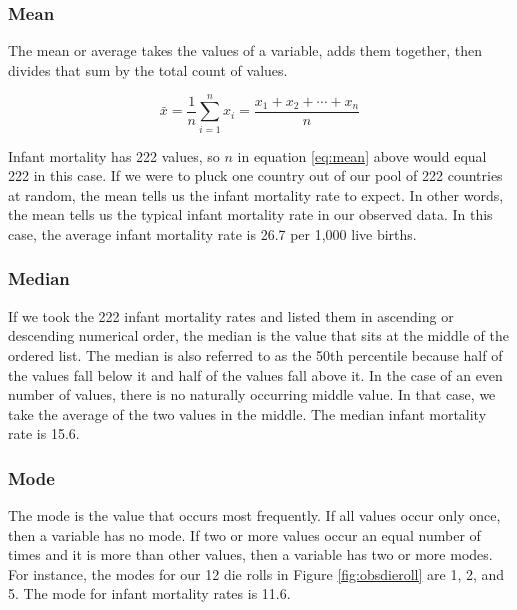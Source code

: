 \documentclass[
]{book}
\begin{document}
\hypertarget{mean}{%
\subsubsection*{Mean}\label{mean}}


The mean or average takes the values of a variable, adds them together, then divides that sum by the total count of values.

\begin{equation}
{\displaystyle \bar{x}={\frac {1}{n}}\sum _{i=1}^{n}x_{i}={\frac {x_{1}+x_{2}+\cdots +x_{n}}{n}}}
\label{eq:mean}
\end{equation}

Infant mortality has 222 values, so \(n\) in equation \eqref{eq:mean} above would equal 222 in this case. If we were to pluck one country out of our pool of 222 countries at random, the mean tells us the infant mortality rate to expect. In other words, the mean tells us the typical infant mortality rate in our observed data. In this case, the average infant mortality rate is 26.7 per 1,000 live births.

\hypertarget{median}{%
\subsubsection*{Median}\label{median}}


If we took the 222 infant mortality rates and listed them in ascending or descending numerical order, the median is the value that sits at the middle of the ordered list. The median is also referred to as the 50th percentile because half of the values fall below it and half of the values fall above it. In the case of an even number of values, there is no naturally occurring middle value. In that case, we take the average of the two values in the middle. The median infant mortality rate is 15.6.

\hypertarget{mode}{%
\subsubsection*{Mode}\label{mode}}


The mode is the value that occurs most frequently. If all values occur only once, then a variable has no mode. If two or more values occur an equal number of times and it is more than other values, then a variable has two or more modes. For instance, the modes for our 12 die rolls in Figure \ref{fig:obsdieroll} are 1, 2, and 5. The mode for infant mortality rates is 11.6.
\end{document}
